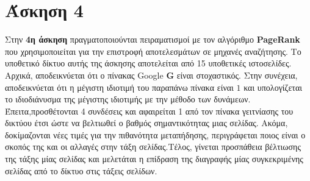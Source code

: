 \documentclass[First Project.tex]{subfiles}
\begin{document}
\section{ Άσκηση 4 }
Στην \textbf{4η άσκηση} πραγματοποιούνται πειραματισμοί με τον αλγόριθμο \textlatin{\textbf{PageRank}} που χρησιμοποιείται για την επιστροφή 
αποτελεσμάτων σε μηχανές αναζήτησης. Το υποθετικό δίκτυο αυτής της άσκησης αποτελείται από 15 υποθετικές ιστοσελίδες. Αρχικά, αποδεικνύεται ότι 
ο πίνακας \textlatin{Google} \textlatin{\textbf{G}}  είναι στοχαστικός. Στην συνέχεια, αποδεικνύεται ότι η μέγιστη ιδιοτιμή του παραπάνω πίνακα 
είναι $1$ και υπολογίζεται το ιδιοδιάνυσμα της μέγιστης ιδιοτιμής με την μέθοδο των δυνάμεων. Έπειτα,προσθέτονται 4 συνδέσεις και αφαιρείται 1 
από τον πίνακα γειτνίασης του δικτύου έτσι ώστε να βελτιωθεί ο βαθμός σημαντικότητας μιας σελίδας. Ακόμα, δοκίμαζονται νέες τιμές για την 
πιθανότητα μεταπήδησης, περιγράφεται ποιος είναι ο σκοπός της και οι αλλαγές στην τάξη σελίδας.Τέλος, γίνεται προσπάθεια βέλτιωσης της 
τάξης μίας σελίδας και μελετάται η επίδραση της διαγραφής μίας συγκεκριμένης σελίδας από το δίκτυο στις τάξεις σελίδων.
\end{document}
